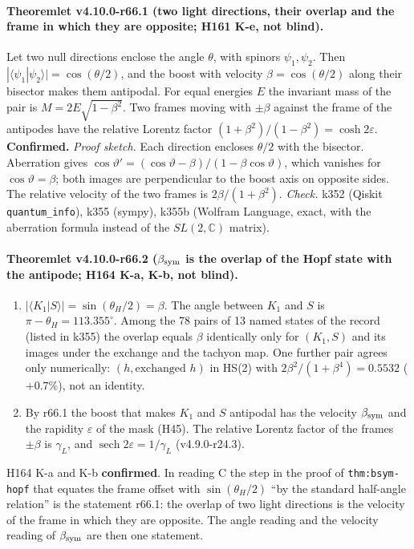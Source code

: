 \paragraph{Theoremlet v4.10.0-r66.1 (two light directions, their overlap and the frame in which they are opposite; H161 K-e, not blind).}
Let two null directions enclose the angle \(\theta\), with spinors \(\psi_1,\psi_2\).  Then \(|\langle\psi_1|\psi_2\rangle|=\cos(\theta/2)\), and the
boost with velocity \(\beta=\cos(\theta/2)\) along their bisector makes them antipodal.  For equal energies \(E\) the invariant mass of the pair is
\(M=2E\sqrt{1-\beta^2}\).  Two frames moving with \(\pm\beta\) against the frame of the antipodes have the relative Lorentz factor
\((1+\beta^2)/(1-\beta^2)=\cosh2\varepsilon\).  \textbf{Confirmed.}
\emph{Proof sketch.}  Each direction encloses \(\theta/2\) with the bisector.  Aberration gives \(\cos\vartheta'=(\cos\vartheta-\beta)/(1-\beta\cos\vartheta)\),
which vanishes for \(\cos\vartheta=\beta\); both images are perpendicular to the boost axis on opposite sides.  The relative velocity of the two
frames is \(2\beta/(1+\beta^2)\).
\emph{Check.} k352 (Qiskit \texttt{quantum\_info}), k355 (sympy), k355b (Wolfram Language, exact, with the aberration formula instead of the
\(SL(2,\mathbb C)\) matrix).

\paragraph{Theoremlet v4.10.0-r66.2 (\(\beta_{\rm sym}\) is the overlap of the Hopf state with the antipode; H164 K-a, K-b, not blind).}
\begin{enumerate}[leftmargin=2em]
\item[(a)] \(|\langle K_1|S\rangle|=\sin(\theta_H/2)=\beta\).  The angle between \(K_1\) and \(S\) is \(\pi-\theta_H=113.355^\circ\).  Among the 78
pairs of 13 named states of the record (listed in k355) the overlap equals \(\beta\) identically only for \((K_1,S)\) and its images under the exchange
and the tachyon map.  One further pair agrees only numerically: \((h,\text{exchanged }h)\) in HS(2) with \(2\beta^2/(1+\beta^4)=0.5532\) (\(+0.7\%\)), not an
identity.
\item[(b)] By r66.1 the boost that makes \(K_1\) and \(S\) antipodal has the velocity \(\beta_{\rm sym}\) and the rapidity \(\varepsilon\) of the mask
(H45).  The relative Lorentz factor of the frames \(\pm\beta\) is \(\gamma_L\), and \(\operatorname{sech}2\varepsilon=1/\gamma_L\) (v4.9.0-r24.3).
\end{enumerate}
H164 K-a and K-b \textbf{confirmed}.  In reading C the step in the proof of \texttt{thm:bsym-hopf} that equates the frame offset with
\(\sin(\theta_H/2)\) ``by the standard half-angle relation'' is the statement r66.1: the overlap of two light directions is the velocity of the frame
in which they are opposite.  The angle reading and the velocity reading of \(\beta_{\rm sym}\) are then one statement.

